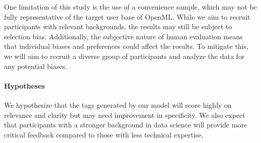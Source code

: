 One limitation of this study is the use of a convenience sample, which may not be fully representative of the target user base of OpenML. While we aim to recruit participants with relevant backgrounds, the results may still be subject to selection bias. Additionally, the subjective nature of human evaluation means that individual biases and preferences could affect the results. To mitigate this, we will aim to recruit a diverse group of participants and analyze the data for any potential biases.

\paragraph{Hypotheses}
We hypothesize that the tags generated by our model will score highly on relevance and clarity but may need improvement in specificity. We also expect that participants with a stronger background in data science will provide more critical feedback compared to those with less technical expertise.